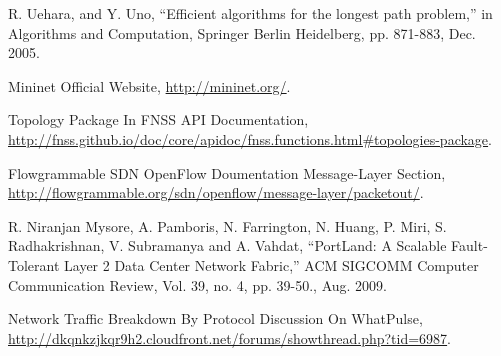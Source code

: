\documentclass[conference]{IEEEtran}
\begin{document}
\begin{thebibliography}{1}
R. Uehara, and Y. Uno,
``Efficient algorithms for the longest path problem,'' in Algorithms and Computation, Springer Berlin Heidelberg, pp. 871-883, Dec. 2005.


Mininet Official Website, \url{http://mininet.org/}.

Topology Package In FNSS API Documentation, \url{http://fnss.github.io/doc/core/apidoc/fnss.functions.html#topologies-package}.

Flowgrammable SDN OpenFlow Doumentation Message-Layer Section, \url{http://flowgrammable.org/sdn/openflow/message-layer/packetout/}.

R. Niranjan Mysore, A. Pamboris, N. Farrington, N. Huang, P. Miri, S. Radhakrishnan, V. Subramanya and A. Vahdat, ``PortLand: A Scalable Fault-Tolerant Layer 2 Data Center Network Fabric,'' ACM SIGCOMM Computer Communication Review, Vol. 39, no. 4, pp. 39-50., Aug. 2009.

Network Traffic Breakdown By Protocol Discussion On WhatPulse, \url{http://dkqnkzjkqr9h2.cloudfront.net/forums/showthread.php?tid=6987}.

\end{thebibliography}




\end{document}
